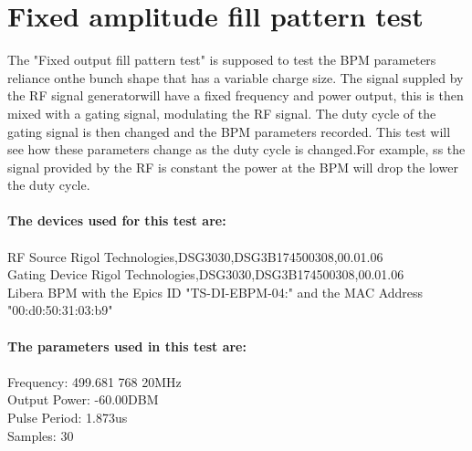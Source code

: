 \documentclass[a4paper, 11pt]{article}%
\begin{document}
\section{Fixed amplitude fill pattern test}%
The "Fixed output fill pattern test" is supposed to test the BPM parameters reliance onthe bunch shape that has a variable charge size. The signal suppled by the RF signal generatorwill have a fixed frequency and power output, this is then mixed with a gating signal, modulating the RF signal. The duty cycle of the gating signal is then changed and the BPM parameters recorded. This test will see how these parameters change as the duty cycle is changed.For example, ss the signal provided by the RF is constant the power at the BPM will drop the lower the duty cycle.\\\\%
\textbf{The devices used for this test are:}\\\\%
RF Source Rigol Technologies,DSG3030,DSG3B174500308,00.01.06\\%
Gating Device Rigol Technologies,DSG3030,DSG3B174500308,00.01.06\\%
Libera BPM with the Epics ID "TS-DI-EBPM-04:" and the MAC Address "00:d0:50:31:03:b9"\\%
\\%
\textbf{The parameters used in this test are:}\\\\%
Frequency: 499.681 768 20MHz\\%
Output Power: -60.00DBM\\%
Pulse Period: 1.873us\\%
Samples: 30\\
\end{document}
